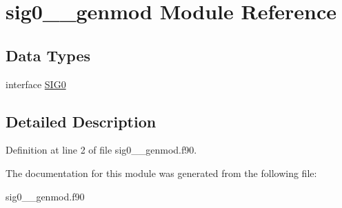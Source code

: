 \hypertarget{classsig0____genmod}{\section{sig0\+\_\+\+\_\+genmod Module Reference}
\label{classsig0____genmod}
}
\subsection*{Data Types}
\begin{DoxyCompactItemize}
\item 
interface \hyperlink{interfacesig0____genmod_1_1_s_i_g0}{S\+I\+G0}
\end{DoxyCompactItemize}


\subsection{Detailed Description}


Definition at line 2 of file sig0\+\_\+\+\_\+genmod.\+f90.



The documentation for this module was generated from the following file\+:\begin{DoxyCompactItemize}
\item 
sig0\+\_\+\+\_\+genmod.\+f90\end{DoxyCompactItemize}
